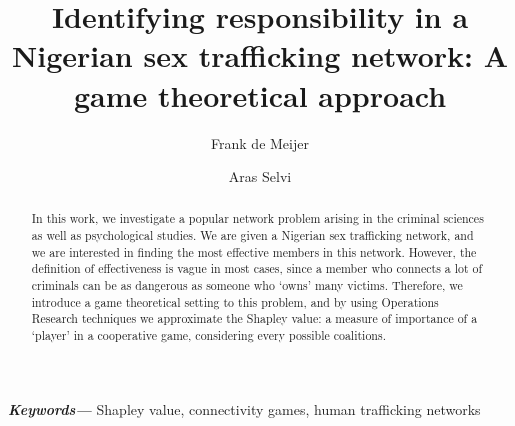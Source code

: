 \documentclass[10p]{article}
\makeatletter
\newcommand{\reqnomode}{\tagsleft@false\let\veqno\@@eqno}
\providecommand{\keywords}[1]{\textbf{\textit{Keywords---}} #1} %
\theoremstyle{definition}
\theoremstyle{definition}
\makeatother
\begin{document}
\setlength{\droptitle}{-4em}   %

\title{Identifying responsibility in a Nigerian sex trafficking network: A game theoretical approach}
\author[1]{Frank de Meijer}
\author[2]{Aras Selvi}

\date{}

\maketitle

\begin{abstract} \noindent
In this work, we investigate a popular network problem arising in the criminal sciences as well as psychological studies. We are given a Nigerian sex trafficking network, and we are interested in finding the most effective members in this network. However, the definition of effectiveness is vague in most cases, since a member who connects a lot of criminals can be as dangerous as someone who `owns' many victims. Therefore, we introduce a game theoretical setting to this problem, and by using Operations Research techniques we approximate the Shapley value: a measure of importance of a `player' in a cooperative game, considering every possible coalitions. 
\end{abstract}
\keywords{Shapley value, connectivity games, human trafficking networks}

\reqnomode
\end{document}

